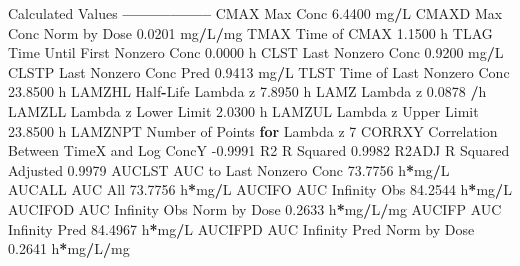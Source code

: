 \documentclass[12pt,]{krantz}
\newenvironment{Shaded}{\begin{snugshade}}{\end{snugshade}}
\newcommand{\ControlFlowTok}[1]{\textcolor[rgb]{0.13,0.29,0.53}{\textbf{#1}}}
\newcommand{\DecValTok}[1]{\textcolor[rgb]{0.00,0.00,0.81}{#1}}
\newcommand{\FloatTok}[1]{\textcolor[rgb]{0.00,0.00,0.81}{#1}}
\newcommand{\NormalTok}[1]{#1}
\newcommand{\OperatorTok}[1]{\textcolor[rgb]{0.81,0.36,0.00}{\textbf{#1}}}
\begin{document}
\begin{Shaded}
\begin{Highlighting}[]
\NormalTok{Calculated Values}
\OperatorTok{-----------------}
\NormalTok{CMAX       Max Conc                                        }\FloatTok{6.4400}\NormalTok{ mg}\OperatorTok{/}\NormalTok{L}
\NormalTok{CMAXD      Max Conc Norm by Dose                           }\FloatTok{0.0201}\NormalTok{ mg}\OperatorTok{/}\NormalTok{L}\OperatorTok{/}\NormalTok{mg}
\NormalTok{TMAX       Time of CMAX                                    }\FloatTok{1.1500}\NormalTok{ h}
\NormalTok{TLAG       Time Until First Nonzero Conc                   }\FloatTok{0.0000}\NormalTok{ h}
\NormalTok{CLST       Last Nonzero Conc                               }\FloatTok{0.9200}\NormalTok{ mg}\OperatorTok{/}\NormalTok{L}
\NormalTok{CLSTP      Last Nonzero Conc Pred                          }\FloatTok{0.9413}\NormalTok{ mg}\OperatorTok{/}\NormalTok{L}
\NormalTok{TLST       Time of Last Nonzero Conc                      }\FloatTok{23.8500}\NormalTok{ h}
\NormalTok{LAMZHL     Half}\OperatorTok{-}\NormalTok{Life Lambda z                              }\FloatTok{7.8950}\NormalTok{ h}
\NormalTok{LAMZ       Lambda z                                        }\FloatTok{0.0878} \OperatorTok{/}\NormalTok{h}
\NormalTok{LAMZLL     Lambda z Lower Limit                            }\FloatTok{2.0300}\NormalTok{ h}
\NormalTok{LAMZUL     Lambda z Upper Limit                           }\FloatTok{23.8500}\NormalTok{ h}
\NormalTok{LAMZNPT    Number of Points }\ControlFlowTok{for}\NormalTok{ Lambda z                   }\DecValTok{7}
\NormalTok{CORRXY     Correlation Between TimeX and Log ConcY        }\FloatTok{-0.9991} 
\NormalTok{R2         R Squared                                       }\FloatTok{0.9982} 
\NormalTok{R2ADJ      R Squared Adjusted                              }\FloatTok{0.9979} 
\NormalTok{AUCLST     AUC to Last Nonzero Conc                       }\FloatTok{73.7756}\NormalTok{ h}\OperatorTok{*}\NormalTok{mg}\OperatorTok{/}\NormalTok{L}
\NormalTok{AUCALL     AUC All                                        }\FloatTok{73.7756}\NormalTok{ h}\OperatorTok{*}\NormalTok{mg}\OperatorTok{/}\NormalTok{L}
\NormalTok{AUCIFO     AUC Infinity Obs                               }\FloatTok{84.2544}\NormalTok{ h}\OperatorTok{*}\NormalTok{mg}\OperatorTok{/}\NormalTok{L}
\NormalTok{AUCIFOD    AUC Infinity Obs Norm by Dose                   }\FloatTok{0.2633}\NormalTok{ h}\OperatorTok{*}\NormalTok{mg}\OperatorTok{/}\NormalTok{L}\OperatorTok{/}\NormalTok{mg}
\NormalTok{AUCIFP     AUC Infinity Pred                              }\FloatTok{84.4967}\NormalTok{ h}\OperatorTok{*}\NormalTok{mg}\OperatorTok{/}\NormalTok{L}
\NormalTok{AUCIFPD    AUC Infinity Pred Norm by Dose                  }\FloatTok{0.2641}\NormalTok{ h}\OperatorTok{*}\NormalTok{mg}\OperatorTok{/}\NormalTok{L}\OperatorTok{/}\NormalTok{mg}

\end{Highlighting}
\end{Shaded}
\end{document}
